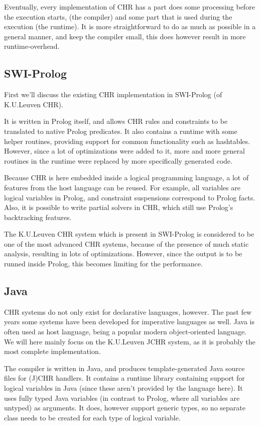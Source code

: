 \documentclass{llncs}
\begin{document}
Eventually, every implementation of CHR has a part does some processing before the execution starts,
(the compiler) and some part that is used during the execution (the runtime).
It is more straightforward to do as much as possible in a general manner, and keep
the compiler small, this does however result in more runtime-overhead.

\subsection{SWI-Prolog}

First we'll discuss the existing CHR implementation in SWI-Prolog (of K.U.Leuven CHR).

It is written in Prolog itself, and allows CHR rules and constraints to be translated
to native Prolog predicates. It also contains a runtime with some helper routines,
providing support for common functionality such as hashtables. However, since a lot of
optimizations were added to it, more and more general routines in the runtime were
replaced by more specifically generated code.

Because CHR is here embedded inside a logical programming language, a lot of features from
the host language can be reused. For example, all variables are logical variables in Prolog, and constraint
suspensions correspond to Prolog facts. Also, it is possible to write partial solvers in
CHR, which still use Prolog's backtracking features.

The K.U.Leuven CHR system which is present in SWI-Prolog is considered to be one of the most
advanced CHR systems, because of the presence of much static analysis, resulting in lots of
optimizations. However, since the output is to be runned inside Prolog, this becomes limiting
for the performance.

\subsection{Java}

CHR systems do not only exist for declarative languages, however. The past few years some
systems have been developed for imperative languages as well. Java is often used as
host language, being a popular modern object-oriented language. We will here mainly focus
on the K.U.Leuven JCHR system, as it is probably the most complete implementation.

The compiler is written in Java, and produces template-generated Java source files for (J)CHR handlers.
It contains a runtime library containing support for logical variables in Java (since these aren't
provided by the language here). It uses fully typed Java variables (in contrast to Prolog, where
all variables are untyped) as arguments. It does, however support generic types, so no separate
class needs to be created for each type of logical variable.
\end{document}
